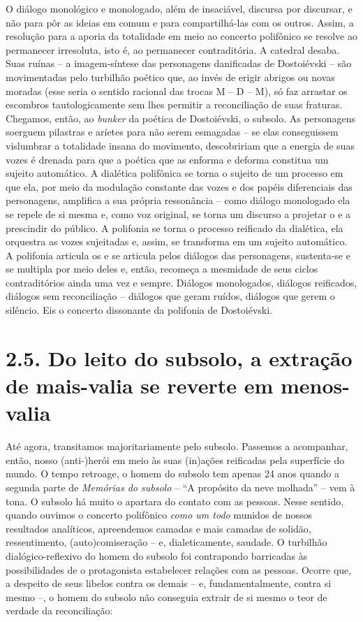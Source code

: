 O diálogo monológico e monologado, além de insaciável, discursa por
discursar, e não para pôr as ideias em comum e para compartilhá-las com
os outros. Assim, a resolução para a aporia da totalidade em meio ao
concerto polifônico se resolve ao permanecer irresoluta, isto é, ao
permanecer contraditória. A catedral desaba. Suas ruínas -- a
imagem-síntese das personagens danificadas de Dostoiévski -- são
movimentadas pelo turbilhão poético que, ao invés de erigir abrigos ou
novas moradas (esse seria o sentido racional das trocas M -- D -- M), só
faz arrastar os escombros tautologicamente sem lhes permitir a
reconciliação de suas fraturas. Chegamos, então, ao \emph{bunker} da
poética de Dostoiévski, o subsolo. As personagens soerguem pilastras e
aríetes para não serem esmagadas -- se elas conseguissem vislumbrar a
totalidade insana do movimento, descobririam que a energia de suas vozes
é drenada para que a poética que as enforma e deforma constitua um
sujeito automático. A dialética polifônica se torna o sujeito de um
processo em que ela, por meio da modulação constante das vozes e dos
papéis diferenciais das personagens, amplifica a sua própria ressonância
-- como diálogo monologado ela se repele de si mesma e, como voz
original, se torna um discurso a projetar o e a prescindir do público. A
polifonia se torna o processo reificado da dialética, ela orquestra as
vozes sujeitadas e, assim, se transforma em um sujeito automático. A
polifonia articula os e se articula pelos diálogos das personagens,
sustenta-se e se multipla por meio deles e, então, recomeça a mesmidade
de seus ciclos contraditórios ainda uma vez e sempre. Diálogos
monologados, diálogos reificados, diálogos sem reconciliação -- diálogos
que geram ruídos, diálogos que gerem o silêncio. Eis o concerto
dissonante da polifonia de Dostoiévski.

\section{2.5. Do leito do subsolo, a extração de mais-valia se reverte em
menos-valia}

Até agora, transitamos majoritariamente pelo subsolo. Passemos a
acompanhar, então, nosso (anti-)herói em meio às suas (in)ações
reificadas pela superfície do mundo. O tempo retroage, o homem do
subsolo tem apenas 24 anos quando a segunda parte de \emph{Memórias do
subsolo} -- ``A propósito da neve molhada'' -- vem à tona. O subsolo há
muito o apartara do contato com as pessoas. Nesse sentido, quando
ouvimos o concerto polifônico \emph{como um todo} munidos de nossos
resultados analíticos, apreendemos camadas e mais camadas de solidão,
ressentimento, (auto)comiseração -- e, dialeticamente, saudade. O
turbilhão dialógico-reflexivo do homem do subsolo foi contrapondo
barricadas às possibilidades de o protagonista estabelecer relações com
as pessoas. Ocorre que, a despeito de seus libelos contra os demais --
e, fundamentalmente, contra si mesmo --, o homem do subsolo não
conseguia extrair de si mesmo o teor de verdade da reconciliação:

